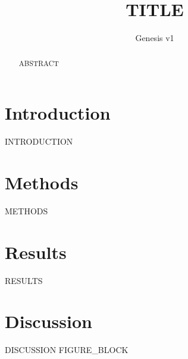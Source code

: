 \documentclass{article}
\title{{{TITLE}}}
\author{Genesis v1}
\begin{document}
\maketitle
\begin{abstract}
{{ABSTRACT}}
\end{abstract}
\section{Introduction}
{{INTRODUCTION}}
\section{Methods}
{{METHODS}}
\section{Results}
{{RESULTS}}
\section{Discussion}
{{DISCUSSION}}
{{FIGURE_BLOCK}}


\end{document}
